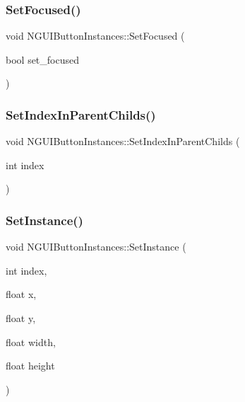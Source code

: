 \hypertarget{class_n_g_u_i_button_instances_a3e8fd5a385ea05b28325d5d8122d30b4}{}\label{class_n_g_u_i_button_instances_a3e8fd5a385ea05b28325d5d8122d30b4} 
\subsubsection{\texorpdfstring{Set\+Focused()}{SetFocused()}}
{\footnotesize\ttfamily void N\+G\+U\+I\+Button\+Instances\+::\+Set\+Focused (\begin{DoxyParamCaption}\item[{bool}]{set\+\_\+focused }\end{DoxyParamCaption})}

\hypertarget{class_n_g_u_i_button_instances_a3b5b2fa9e2f94827b64cfe4688597a86}{}\label{class_n_g_u_i_button_instances_a3b5b2fa9e2f94827b64cfe4688597a86} 
\subsubsection{\texorpdfstring{Set\+Index\+In\+Parent\+Childs()}{SetIndexInParentChilds()}}
{\footnotesize\ttfamily void N\+G\+U\+I\+Button\+Instances\+::\+Set\+Index\+In\+Parent\+Childs (\begin{DoxyParamCaption}\item[{int}]{index }\end{DoxyParamCaption})}

\hypertarget{class_n_g_u_i_button_instances_a6d1bd3fa83a29998daf10450c85d3f1b}{}\label{class_n_g_u_i_button_instances_a6d1bd3fa83a29998daf10450c85d3f1b} 
\subsubsection{\texorpdfstring{Set\+Instance()}{SetInstance()}}
{\footnotesize\ttfamily void N\+G\+U\+I\+Button\+Instances\+::\+Set\+Instance (\begin{DoxyParamCaption}\item[{int}]{index,  }\item[{float}]{x,  }\item[{float}]{y,  }\item[{float}]{width,  }\item[{float}]{height }\end{DoxyParamCaption})}

